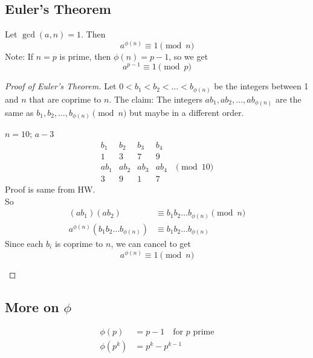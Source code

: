     \subsection{Euler's Theorem}
    \begin{theorem} 
        Let $\gcd(a,n)=1$. Then 
        \[ a^{\phi(n)}\equiv 1\pmod{n} \]
        Note: If $n=p$ is prime, then $\phi(n)=p-1$, so we get 
        \[ a^{p-1}\equiv 1\pmod{p} \]
        \begin{proof} [Proof of Euler's Theorem]
            Let $0<b_1<b_2<\dots<b_{\phi(n)}$ be the integers between 
            1 and $n$ that are coprime to $n$. The claim: The integers 
            $ab_1, ab_2, \dots, ab_{\phi(n)}$ are the same as 
            $b_1,b_2,\dots,b_{\phi(n)}\pmod{n}$ but maybe in a different order.
            \begin{example}
                $n=10$; $a-3$
                \[
                \begin{matrix}
                    b_1 & b_2 & b_3 & b_4 \\
                    1 & 3 & 7 & 9 \\
                    ab_1 & ab_2 & ab_3 & ab_4 & \pmod{10} \\
                    3 & 9 & 1 & 7
                \end{matrix}
                \]
                Proof is same from HW. \\
                So
                \begin{align*}
                    (ab_1)(ab_2) &\equiv b_1b_2\dots b_{\phi(n)} \pmod{n} \\
                    a^{\phi(n)}(b_1b_2\dots b_{\phi(n)}) &\equiv b_1b_2\dots b_{\phi(n)}
                \end{align*}
                Since each $b_i$ is coprime to $n$, we can cancel to get 
                \[ a^{\phi(n)}\equiv 1\pmod{n} \]
            \end{example}
        \end{proof}
    \end{theorem}

    \subsection{More on $\phi$}
        \begin{align*}
            \phi(p) &= p-1 \quad\text{for } p \text{ prime} \\
            \phi(p^k) &= p^k - p^{k-1} 
        \end{align*}

